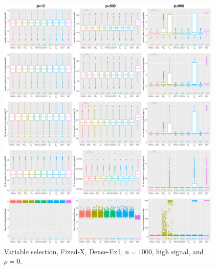 \begin{figure}[!ht]
\centering
\includegraphics[width=\textwidth]{figures/supplement/fixedx/subset_selection/Dense-Ex1_n1000_hsnr_rho0.eps}
\caption{Variable selection, Fixed-X, Dense-Ex1, $n=1000$, high signal, and $\rho=0$.}
\end{figure}
\clearpage
